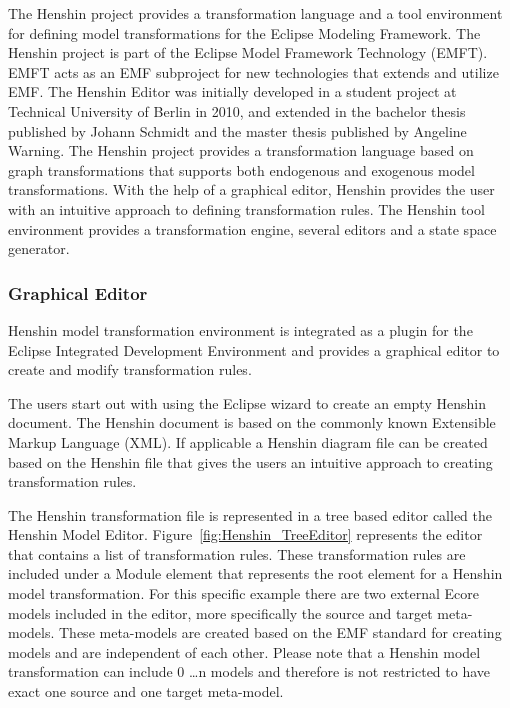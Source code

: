 The Henshin project\cite{Henshin} provides a transformation
language and a tool environment for defining model transformations for the
Eclipse Modeling Framework. The Henshin project is part of the Eclipse Model
Framework Technology (EMFT). EMFT acts as an EMF subproject for new
technologies that extends and utilize EMF. The Henshin Editor was initially
developed in a student project at Technical University of Berlin in 2010, and
extended in the bachelor thesis \cite{JohannSchmidt} published by Johann Schmidt
and the master thesis \cite{AngelineWarning} published by Angeline Warning.
The Henshin project provides a transformation language based on graph
transformations that supports both endogenous and exogenous model
transformations. With the help of a graphical editor, Henshin provides the user
with an intuitive approach to defining transformation rules. The Henshin tool
environment provides a transformation engine, several editors and a state space
generator.

\subsubsection*{Graphical Editor}
Henshin model transformation environment is integrated as a plugin for the
Eclipse Integrated Development Environment\cite{Eclipse} and provides a
graphical editor to create and modify transformation rules. 

The users start out with using the Eclipse wizard to create an empty Henshin
document. The Henshin document is based on the commonly known Extensible Markup
Language (XML)\cite{XML}. If applicable a Henshin diagram file can be created
based on the Henshin file that gives the users an intuitive approach to
creating transformation rules.

The Henshin transformation file is represented in a tree based editor called
the Henshin Model Editor. Figure~\ref{fig:Henshin_TreeEditor} represents the
editor that contains a list of transformation rules. These transformation rules
are included under a Module element that represents the root element for a
Henshin model transformation. For this specific example there are two external
Ecore models included in the editor, more specifically the source and target
meta-models. These meta-models are created based on the EMF standard for
creating models and are independent of each other. Please note that a Henshin
model transformation can include 0 \ldots n models and therefore is not
restricted to have exact one source and one target meta-model.

